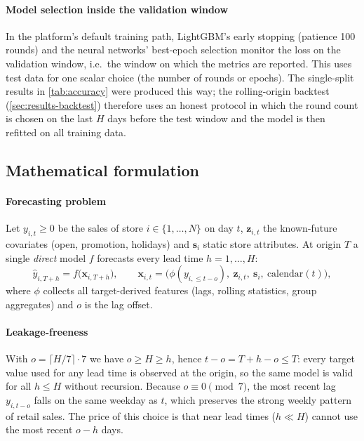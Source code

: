 \documentclass[conference]{IEEEtran}
\begin{document}
\paragraph*{Model selection inside the validation window} In the platform's default training path,
LightGBM's early stopping (patience 100 rounds) and the neural networks' best-epoch selection monitor
the loss on the validation window, i.e.\ the window on which the metrics are reported. This uses test
data for one scalar choice (the number of rounds or epochs). The single-split results in
\cref{tab:accuracy} were produced this way; the rolling-origin backtest (\cref{sec:results-backtest})
therefore uses an honest protocol in which the round count is chosen on the last $H$ days before the
test window and the model is then refitted on all training data.

\subsection{Mathematical formulation}\label{sec:math}
\paragraph*{Forecasting problem} Let $y_{i,t}\ge 0$ be the sales of store $i\in\{1,\dots,N\}$ on day
$t$, $\mathbf{z}_{i,t}$ the known-future covariates (open, promotion, holidays) and $\mathbf{s}_i$
static store attributes. At origin $T$ a single \emph{direct} model $f$ forecasts every lead time
$h=1,\dots,H$:
\begin{equation}
  \hat y_{i,T+h} = f\bigl(\mathbf{x}_{i,T+h}\bigr),\qquad
  \mathbf{x}_{i,t} = \bigl(\phi(y_{i,\le t-o}),\ \mathbf{z}_{i,t},\ \mathbf{s}_i,\ \text{calendar}(t)\bigr),
\end{equation}
where $\phi$ collects all target-derived features (lags, rolling statistics, group aggregates) and
$o$ is the lag offset.

\paragraph*{Leakage-freeness} With $o=\lceil H/7\rceil\cdot 7$ we have $o\ge H\ge h$, hence
$t-o = T+h-o \le T$: every target value used for any lead time is observed at the origin, so the same
model is valid for all $h\le H$ without recursion. Because $o\equiv 0 \pmod 7$, the most recent lag
$y_{i,t-o}$ falls on the same weekday as $t$, which preserves the strong weekly pattern of retail
sales. The price of this choice is that near lead times ($h\ll H$) cannot use the most recent
$o-h$ days.
\end{document}
